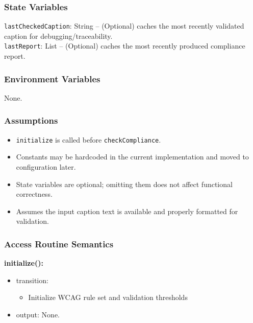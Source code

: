 \documentclass[12pt, titlepage]{article}
\begin{document}
\subsubsection{State Variables}
\texttt{lastCheckedCaption}: String -- (Optional) caches the most recently validated caption for debugging/traceability.\\
\texttt{lastReport}: List -- (Optional) caches the most recently produced compliance report.

\subsubsection{Environment Variables}
None.

\subsubsection{Assumptions}
\begin{itemize}
  \item \texttt{initialize} is called before \texttt{checkCompliance}.
  \item Constants may be hardcoded in the current implementation and moved to configuration later.
  \item State variables are optional; omitting them does not affect functional correctness.
  \item Assumes the input caption text is available and properly formatted for validation.
\end{itemize}

\subsubsection{Access Routine Semantics}
\noindent \textbf{initialize():}
\begin{itemize}
  \item transition:
  \begin{itemize}
    \item Initialize WCAG rule set and validation thresholds
  \end{itemize}
  \item output: None.
\end{itemize}
\end{document}
